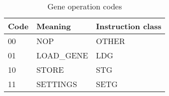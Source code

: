 \begin{table}[h]
\centering
    \begin{tabular}{| l | l | l |}
     \hline
     Code  & Meaning      & Instruction class \\
     \hline
     00    & NOP          &   OTHER           \\
     01    & LOAD\_GENE   &   LDG             \\
     10    & STORE        &   STG             \\
     11    & SETTINGS     &   SETG            \\
    \hline
    \end{tabular}
    
    \caption{Gene operation codes}
    \label{fpga:tbl:gene_op_code_tbl}
    

\end{table}
